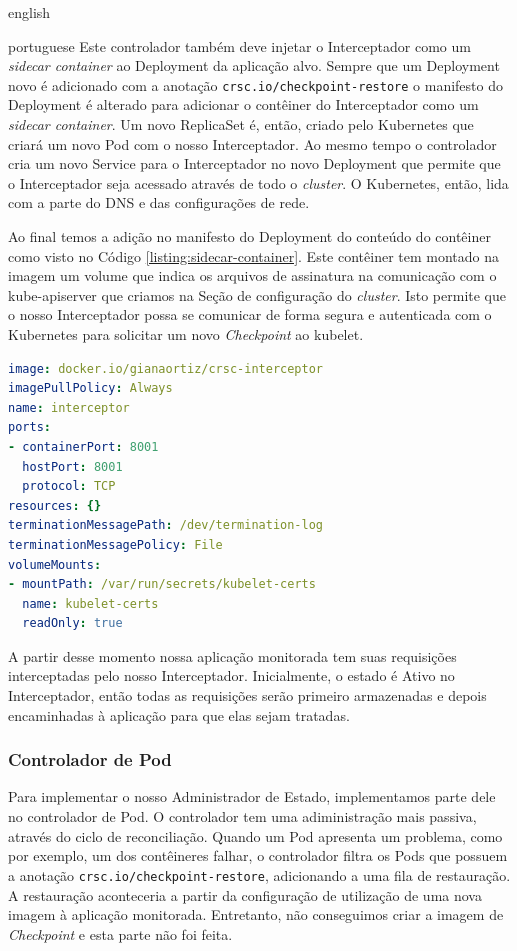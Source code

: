 \begin{otherlanguage*}{english}
\begin{otherlanguage*}{portuguese}
Este controlador também deve injetar o Interceptador como um \textit{sidecar container}
ao Deployment da aplicação alvo. Sempre que um Deployment novo é adicionado com a 
anotação \texttt{crsc.io/checkpoint-restore} o manifesto do Deployment é alterado
para adicionar o contêiner do Interceptador como um \textit{sidecar container}. Um novo
ReplicaSet é, então, criado pelo Kubernetes que criará um novo Pod com o nosso
Interceptador. Ao mesmo tempo o controlador cria um novo Service para o Interceptador no
novo Deployment que permite que o Interceptador seja acessado através de todo o \textit{cluster}. O
Kubernetes, então, lida com a parte do DNS e das configurações de rede.

Ao final temos a adição no manifesto do Deployment do conteúdo do contêiner como visto no
Código \ref{listing:sidecar-container}. Este contêiner tem montado na imagem um volume
que indica os arquivos de assinatura na comunicação com o kube-apiserver que criamos na
Seção de configuração do \textit{cluster}. Isto permite que o nosso Interceptador possa
se comunicar de forma segura e autenticada com o Kubernetes para solicitar um novo
\textit{Checkpoint} ao kubelet.

\begin{lstlisting}[language=yaml,caption={Configuração do Interceptador para o Deployment da aplicação alvo como sidecar container.},label={listing:sidecar-container}]
image: docker.io/gianaortiz/crsc-interceptor
imagePullPolicy: Always
name: interceptor
ports:
- containerPort: 8001
  hostPort: 8001
  protocol: TCP
resources: {}
terminationMessagePath: /dev/termination-log
terminationMessagePolicy: File
volumeMounts:
- mountPath: /var/run/secrets/kubelet-certs
  name: kubelet-certs
  readOnly: true
\end{lstlisting}

A partir desse momento nossa aplicação monitorada tem suas requisições interceptadas
pelo nosso Interceptador. Inicialmente, o estado é Ativo no Interceptador, então todas
as requisições serão primeiro armazenadas e depois encaminhadas à aplicação para que
elas sejam tratadas.

\subsubsection{Controlador de Pod}

Para implementar o nosso Administrador de Estado, implementamos parte dele no controlador
de Pod. O controlador tem uma adiministração mais passiva, através do ciclo de
reconciliação. Quando um Pod apresenta um problema, como por exemplo, um dos contêineres
falhar, o controlador filtra os Pods que possuem a anotação
\texttt{crsc.io/checkpoint-restore}, adicionando a uma fila de restauração.
A restauração aconteceria a partir da configuração de utilização de uma nova
imagem à aplicação monitorada. Entretanto, não conseguimos criar a imagem de
\textit{Checkpoint} e esta parte não foi feita.


\end{otherlanguage*}
\end{otherlanguage*}
